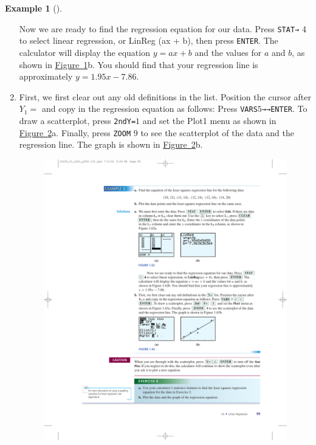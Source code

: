 \documentclass[10pt,]{book}
\theoremstyle{plain}
\theoremstyle{definition}
\theoremstyle{definition}
\newtheorem{example}[theorem]{Example}
\theoremstyle{definition}
\theoremstyle{definition}
\numberwithin{equation}{part}
\begin{document}
\begin{example}[]
\begin{enumerate}[label=*\alph**]
\begin{figure}
\caption{\label{fig-GC-regression}}
\end{figure}
 Now we are ready to find the regression equation for our data. Press \lstinline?STAT?\lstinline?→? 4 to select linear regression, or LinReg (ax + b), then press \lstinline?ENTER?. The calculator will display the equation \(y = ax + b\) and the values for \(a\) and \(b\), as shown in \hyperref[fig-GC-regression]{Figure~\ref{fig-GC-regression}}b. You should find that your regression line is approximately \(y = 1.95x - 7.86\).%
\item\hypertarget{li-1333}{}First, we first clear out any old definitions in the list. Position the cursor after \(Y_1 =\) and copy in the regression equation as follows: Press \lstinline?VARS?\(5\)\lstinline?→?\lstinline?→?\lstinline?ENTER?. To draw a scatterplot, press \lstinline?2nd?\lstinline?Y=?\(1\) and set the Plot1 menu as shown in \hyperref[fig-GC-regression2]{Figure~\ref{fig-GC-regression2}}a. Finally, press \lstinline?ZOOM? \(9\) to see the scatterplot of the data and the regression line. The graph is shown in \hyperref[fig-GC-regression2]{Figure~\ref{fig-GC-regression2}}b. \begin{figure}
\centering
\includegraphics[width=0.8\linewidth]{images/fig-GC-regression2}
\caption{\label{fig-GC-regression2}}
\end{figure}
%
\end{enumerate}
%
\end{example}
\typeout{************************************************}
\typeout{************************************************}
\end{document}
